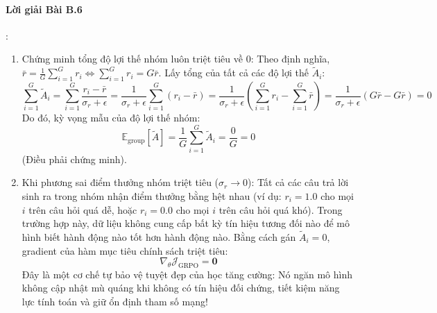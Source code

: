 \paragraph{Lời giải Bài B.6}:
\begin{enumerate}
  \item Chứng minh tổng độ lợi thế nhóm luôn triệt tiêu về $0$:
  Theo định nghĩa, $\bar{r} = \frac{1}{G}\sum_{i=1}^G r_i \iff \sum_{i=1}^G r_i = G \bar{r}$.
  Lấy tổng của tất cả các độ lợi thế $\widetilde{A}_i$:
  \begin{equation*}
  \sum_{i=1}^G \widetilde{A}_i = \sum_{i=1}^G \frac{r_i - \bar{r}}{\sigma_r + \epsilon} = \frac{1}{\sigma_r + \epsilon} \sum_{i=1}^G (r_i - \bar{r}) = \frac{1}{\sigma_r + \epsilon} \left( \sum_{i=1}^G r_i - \sum_{i=1}^G \bar{r} \right) = \frac{1}{\sigma_r + \epsilon} \left( G \bar{r} - G \bar{r} \right) = 0
  \end{equation*}
  Do đó, kỳ vọng mẫu của độ lợi thế nhóm:
  \begin{equation*}
  \mathbb{E}_{\text{group}}[\widetilde{A}] = \frac{1}{G} \sum_{i=1}^G \widetilde{A}_i = \frac{0}{G} = 0
  \end{equation*}
  (Điều phải chứng minh).

  \item Khi phương sai điểm thưởng nhóm triệt tiêu ($\sigma_r \to 0$):
  Tất cả các câu trả lời sinh ra trong nhóm nhận điểm thưởng bằng hệt nhau (ví dụ: $r_i = 1.0$ cho mọi $i$ trên câu hỏi quá dễ, hoặc $r_i = 0.0$ cho mọi $i$ trên câu hỏi quá khó).
  Trong trường hợp này, dữ liệu không cung cấp bất kỳ tín hiệu tương đối nào để mô hình biết hành động nào tốt hơn hành động nào.
  Bằng cách gán $\widetilde{A}_i = 0$, gradient của hàm mục tiêu chính sách triệt tiêu:
  \begin{equation*}
  \nabla_\theta \mathcal{J}_{\text{GRPO}} = \mathbf{0}
  \end{equation*}
  Đây là một cơ chế tự bảo vệ tuyệt đẹp của học tăng cường: Nó ngăn mô hình không cập nhật mù quáng khi không có tín hiệu đối chứng, tiết kiệm năng lực tính toán và giữ ổn định tham số mạng!
\end{enumerate}

